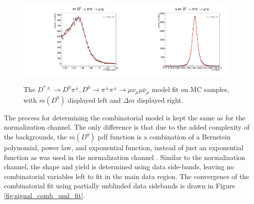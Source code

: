 \begin{figure}[htp]
    \begin{center}
      \includegraphics[width=0.49\textwidth]{figures/chapter4/signal_fit/d0pipimm_2022_2023_0_m.pdf}
      \includegraphics[width=0.49\textwidth]{figures/chapter4/signal_fit/d0pipimm_2022_2023_0_dm.pdf}\\
    \end{center}
    \caption{
      The $D^{*\pm} \to D^0\pi^\pm, D^0 \to \pi^\pm \pi^\pm \to \mu \nu_\mu \mu \bar{\nu}_\mu$ model fit on MC samples, with $m(D^0)$ displayed left and $\Delta m$ displayed right.
    }
    \label{fig:d0munumunu_uml_fit}
\end{figure}


The process for determining the combinatorial model is kept the same as for the normalization channel. The only difference is that due to the added complexity of the backgrounds, the $m(D^0)$ pdf function is a combination of a Bernstein polynomial, power law, and exponential function, instead of just an exponential function as was used in the normalization channel \cite{ref:dauncey_2015}. Similar to the normalization channel, the shape and yield is determined using data side-bands, leaving no combinatorial variables left to fit in the main data region. The convergence of the combinatorial fit using partially unblinded data sidebands is drawn in Figure \ref{fig:signal_comb_uml_fit}.

